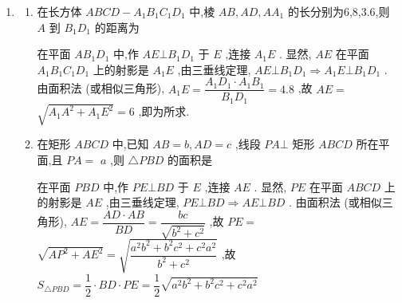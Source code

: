 \begin{enumerate}
\begin{enumerate}
\begin{jieda}
          \end{jieda}
          \item 若 $O$ 在 $\bigtriangleup {ABC}$ 内,且 $P$ 到 $\bigtriangleup {ABC}$ 的三边距离相等,则 $O$ 为 $\bigtriangleup {ABC}$ 的心
          \begin{jieda}
              过点 $O$ 作 $\bigtriangleup {ABC}$ 三边 ${AB},{BC},{CA}$ 的垂线,垂足分别为 $D,E,F$ . 由三垂线定理,点 $P$ 到 $\bigtriangleup {ABC}$ 三边 ${AB}$ 、 ${BC}\text{ 、 }{CA}$ 的距离就是 ${PD},{PE},{PF}\text{ 、 }{PD} = {PE} = {PF} \Longrightarrow  {OD} = {OE} = {OF}$ ,又 $O$ 在 $\bigtriangleup {ABC}$ 内,故 $O$ 为 $\bigtriangleup {ABC}$ 的内心. (注: 若不限定 $O$ 在 $\bigtriangleup {ABC}$ 内,则 $O$ 为 $\bigtriangleup {ABC}$ 的内心或旁心)
          \end{jieda}
          \item 若四面体 ${PABC}$ 的两组对棱互相垂直,则 $O$ 为 $\bigtriangleup  {ABC}$ 的心
          \begin{jieda}
              连接 ${AO}$ ,它是 ${AP}$ 在平面 ${ABC}$ 上的射影. 由三垂线定理, ${PA} \bot  {BC} \Longrightarrow  {AO} \bot  {BC}$ . 同理 ${CO} \bot  {AB}$ 、 ${BO} \bot  {AC}$ , 故 $O$ 为 $\bigtriangleup {ABC}$ 的垂心.
          \end{jieda}
      \end{enumerate}
      \item \begin{enumerate}
          \item 在长方体 ${ABCD} - {A}_{1}{B}_{1}{C}_{1}{D}_{1}$ 中,棱 ${AB},{AD},A{A}_{1}$ 的长分别为6,8,3.6,则 $A$ 到 ${B}_{1}{D}_{1}$ 的距离为
          \begin{jieda}
              在平面 $A{B}_{1}{D}_{1}$ 中,作 ${AE}\bot {B}_{1}{D}_{1}$ 于 $E$ ,连接 ${A}_{1}E$ . 显然, ${AE}$ 在平面 ${A}_{1}{B}_{1}{C}_{1}{D}_{1}$ 上的射影是 ${A}_{1}E$ ,由三垂线定理, ${AE} \bot  {B}_{1}{D}_{1} \Longrightarrow  {A}_{1}E \bot  {B}_{1}{D}_{1}$ . 由面积法 (或相似三角形), ${A}_{1}E = \dfrac{{A}_{1}{D}_{1} \cdot  {A}_{1}{B}_{1}}{{B}_{1}{D}_{1}} = {4.8}$ ,故 ${AE} =$  $\sqrt{{A}_{1}{A}^{2} + {A}_{1}{E}^{2}} = 6$ ,即为所求.
          \end{jieda}
          \item 在矩形 ${ABCD}$ 中,已知 ${AB} = b,{AD} = c$ ,线段 ${PA}\bot$ 矩形 ${ABCD}$ 所在平面,且 ${PA} =$  $a$ ,则 $\bigtriangleup  {PBD}$ 的面积是
          \begin{jieda}
              在平面 ${PBD}$ 中,作 ${PE}\bot {BD}$ 于 $E$ ,连接 ${AE}$ . 显然, ${PE}$ 在平面 ${ABCD}$ 上的射影是 ${AE}$ ,由三垂线定理, ${PE} \bot  {BD} \Longrightarrow  {AE} \bot  {BD}$ . 由面积法 (或相似三角形), ${AE} = \dfrac{{AD} \cdot  {AB}}{BD} = \dfrac{bc}{\sqrt{{b}^{2} + {c}^{2}}}$ ,故 ${PE} =$  $\sqrt{A{P}^{2} + A{E}^{2}} = \sqrt{\dfrac{{a}^{2}{b}^{2} + {b}^{2}{c}^{2} + {c}^{2}{a}^{2}}{{b}^{2} + {c}^{2}}}$ ,故 ${S}_{\bigtriangleup {PBD}} = \dfrac{1}{2} \cdot  {BD} \cdot  {PE} = \dfrac{1}{2}\sqrt{{a}^{2}{b}^{2} + {b}^{2}{c}^{2} + {c}^{2}{a}^{2}}$

\end{jieda}
\end{enumerate}
\end{enumerate}
